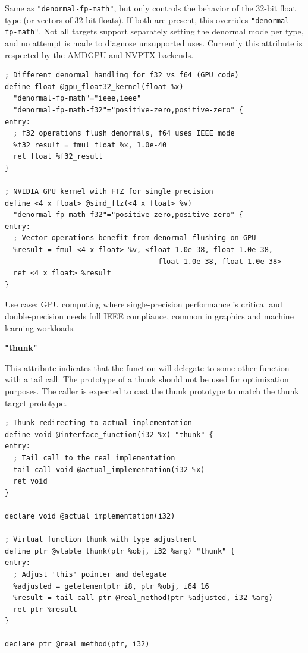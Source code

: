 Same as \texttt{"denormal-fp-math"}, but only controls the behavior of the 32-bit float type (or vectors of 32-bit floats).
If both are present, this overrides \texttt{"denormal-fp-math"}.
Not all targets support separately setting the denormal mode per type, and no attempt is made to diagnose unsupported uses.
Currently this attribute is respected by the AMDGPU and NVPTX backends.

\begin{lstlisting}[style=ir]
; Different denormal handling for f32 vs f64 (GPU code)
define float @gpu_float32_kernel(float %x)
  "denormal-fp-math"="ieee,ieee"
  "denormal-fp-math-f32"="positive-zero,positive-zero" {
entry:
  ; f32 operations flush denormals, f64 uses IEEE mode
  %f32_result = fmul float %x, 1.0e-40
  ret float %f32_result
}

; NVIDIA GPU kernel with FTZ for single precision
define <4 x float> @simd_ftz(<4 x float> %v)
  "denormal-fp-math-f32"="positive-zero,positive-zero" {
entry:
  ; Vector operations benefit from denormal flushing on GPU
  %result = fmul <4 x float> %v, <float 1.0e-38, float 1.0e-38,
                                    float 1.0e-38, float 1.0e-38>
  ret <4 x float> %result
}
\end{lstlisting}

Use case: GPU computing where single-precision performance is critical and double-precision needs full IEEE compliance, common in graphics and machine learning workloads.

\textbf{"thunk"}

This attribute indicates that the function will delegate to some other function with a tail call.
The prototype of a thunk should not be used for optimization purposes.
The caller is expected to cast the thunk prototype to match the thunk target prototype.

\begin{lstlisting}[style=ir]
; Thunk redirecting to actual implementation
define void @interface_function(i32 %x) "thunk" {
entry:
  ; Tail call to the real implementation
  tail call void @actual_implementation(i32 %x)
  ret void
}

declare void @actual_implementation(i32)

; Virtual function thunk with type adjustment
define ptr @vtable_thunk(ptr %obj, i32 %arg) "thunk" {
entry:
  ; Adjust 'this' pointer and delegate
  %adjusted = getelementptr i8, ptr %obj, i64 16
  %result = tail call ptr @real_method(ptr %adjusted, i32 %arg)
  ret ptr %result
}

declare ptr @real_method(ptr, i32)
\end{lstlisting}

